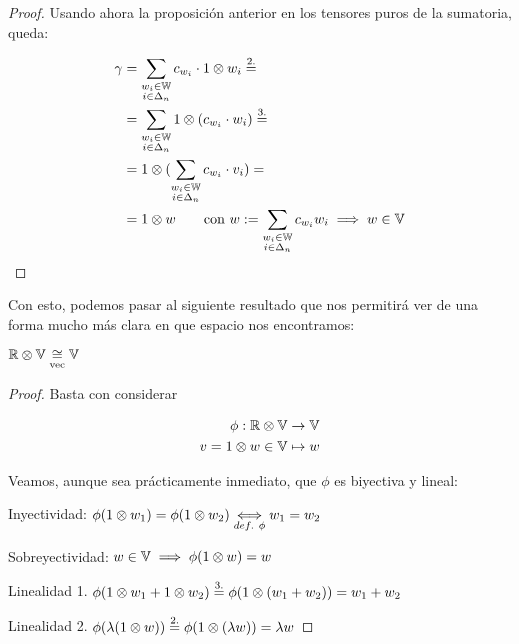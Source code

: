 \begin{ejemplo}
\begin{proof}
        Usando ahora la proposición anterior en los tensores puros de la sumatoria, queda:

        \begin{equation}
        \begin{split}
            \gamma &= \sum_{\substack{w_i \in \mathbb{W}\\ i \in \Delta_{n}}} c_{w_i} \cdot 1 \otimes w_i \stackrel{\text{2.}}{=} \\
            & = \sum_{\substack{w_i \in \mathbb{W}\\ i \in \Delta_{n}}} 1 \otimes (c_{w_i} \cdot w_i) \stackrel{\text{3.}}{=} \\
            & = 1 \otimes ( \sum_{\substack{w_i \in \mathbb{W} \\ i \in \Delta_{n}}} c_{w_i} \cdot v_i ) = \\
            & = 1 \otimes w \qquad \text{con } w := \sum_{\substack{w_i \in \mathbb{W}\\ i \in \Delta_{n}}} c_{w_i} w_i \implies w \in \mathbb{V}
        \end{split}
        \end{equation}

    \end{proof}


    Con esto, podemos pasar al siguiente resultado que nos permitirá ver de una forma mucho más clara en que espacio nos encontramos:

    \begin{proposicion}
        $\mathbb{R} \otimes \mathbb{V} \underset{\text{vec}}{\cong} \mathbb{V}$
    \end{proposicion}
    \begin{proof}
        Basta con considerar

        \begin{equation}
        \begin{split}
            \phi: \mathbb{R} \otimes \mathbb{V} &\to \mathbb{V} \\
            v = 1 \otimes w \in \mathbb{V} &\mapsto w
        \end{split}
        \end{equation}

        Veamos, aunque sea prácticamente inmediato, que $\phi$ es biyectiva y lineal:

        Inyectividad: $\phi(1 \otimes w_1) = \phi(1 \otimes w_2) \underset{def.\ \phi}{\Longleftrightarrow} w_1 = w_2$

        Sobreyectividad: $w \in \mathbb{V} \implies \phi(1 \otimes w) = w$

        Linealidad 1. $\phi(1 \otimes w_1 + 1 \otimes w_2) \stackrel{\text{3.}}{=} \phi(1 \otimes (w_1 + w_2)) = w_1 + w_2$

        Linealidad 2. $\phi(\lambda (1 \otimes w)) \stackrel{\text{2.}}{=} \phi(1 \otimes (\lambda w)) = \lambda w$

    \end{proof}
\end{ejemplo}

